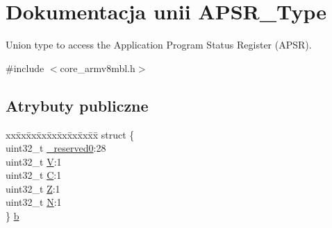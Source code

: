 \hypertarget{union_a_p_s_r___type}{}\section{Dokumentacja unii A\+P\+S\+R\+\_\+\+Type}
\label{union_a_p_s_r___type}


Union type to access the Application Program Status Register (A\+P\+SR).  




{\ttfamily \#include $<$core\+\_\+armv8mbl.\+h$>$}

\subsection*{Atrybuty publiczne}
\begin{DoxyCompactItemize}
\item 
\begin{tabbing}
xx\=xx\=xx\=xx\=xx\=xx\=xx\=xx\=xx\=\kill
struct \{\\
\>uint32\_t \hyperlink{union_a_p_s_r___type_afbce95646fd514c10aa85ec0a33db728}{\_reserved0}:28\\
\>uint32\_t \hyperlink{union_a_p_s_r___type_a8004d224aacb78ca37774c35f9156e7e}{V}:1\\
\>uint32\_t \hyperlink{union_a_p_s_r___type_a86e2c5b891ecef1ab55b1edac0da79a6}{C}:1\\
\>uint32\_t \hyperlink{union_a_p_s_r___type_a3b04d58738b66a28ff13f23d8b0ba7e5}{Z}:1\\
\>uint32\_t \hyperlink{union_a_p_s_r___type_a7e7bbba9b00b0bb3283dc07f1abe37e0}{N}:1\\
\} \hyperlink{union_a_p_s_r___type_a7dbc79a057ded4b11ca5323fc2d5ab14}{b}\\


\end{tabbing}
\end{DoxyCompactItemize}
